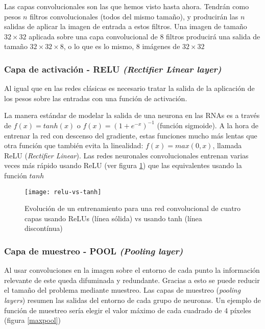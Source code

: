 Las capas convolucionales son las que hemos visto hasta ahora. Tendrán como pesos $n$ filtros convolucionales (todos del mismo tamaño), y producirán las $n$ salidas de aplicar la imagen de entrada a estos filtros. Una imagen de tamaño $32\times 32$ aplicada sobre una capa convolucional de 8 filtros producirá una salida de tamaño $32 \times 32 \times 8$, o lo que es lo mismo, 8 imágenes de $32 \times 32$

\subsubsection{Capa de activación - RELU \textit{(Rectifier Linear layer)}}
\label{sec:relu}

Al igual que en las redes clásicas es necesario tratar la salida de la aplicación de los pesos sobre las entradas con una función de activación. 

La manera estándar de modelar la salida de una neurona en las RNAs es a través de $f(x) = tanh(x)$ o $f(x) = (1 + e^{-x})^{-1}$ (función sigmoide). A la hora de entrenar la red con descenso del gradiente, estas funciones mucho más lentas que otra función que también evita la linealidad: $f(x) = max(0, x)$, llamada ReLU (\textit{Rectifier Linear}). Las redes neuronales convolucionales entrenan varias veces más rápido usando ReLU (ver figura \ref{relu-vs-tanh}) que las equivalentes usando la función $tanh$ \parencite{krizhevsky2012imagenet}

\begin{figure}
    \centering
    \caption{Evolución de un entrenamiento para una red convolucional de cuatro capas usando ReLUs (línea sólida) vs usando tanh (línea discontínua) \parencite{krizhevsky2012imagenet}}
  \label{relu-vs-tanh}
  \texttt{[image: relu-vs-tanh]}
\end{figure}

\subsubsection{Capa de muestreo - POOL \textit{(Pooling layer)}}

Al usar convoluciones en la imagen sobre el entorno de cada punto la información relevante de este queda difuminada y redundante. Gracias a esto se puede reducir el tamaño del problema mediante muestreo.
Las capas de muestreo (\textit{pooling layers}) resumen las salidas del entorno de cada grupo de neuronas. Un ejemplo de función de muestreo sería elegir el valor máximo de cada cuadrado de 4 píxeles (figura \ref{maxpool})


